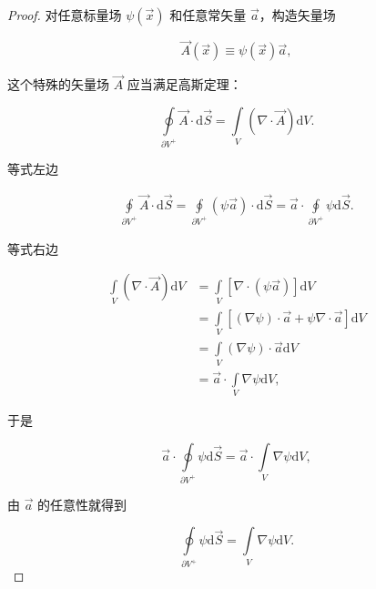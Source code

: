 \begin{proof}

对任意标量场 $\psi(\vec{x}) $ 和任意常矢量 $\vec{a} $，构造矢量场

\begin{equation}
\vec{A}(\vec{x})
\equiv \psi (\vec{x}) \vec{a},
\end{equation}

这个特殊的矢量场 $\vec{A} $ 应当满足高斯定理：

\begin{equation}
\oint\limits_{\partial V^+} \vec{A}\cdot\mathrm{d}\vec{S}
=\int\limits_{V} (\nabla\cdot\vec{A})\mathrm{d}V.
\end{equation}

等式左边

\begin{equation}
\begin{split}
\oint\limits_{\partial V^+} \vec{A}\cdot\mathrm{d}\vec{S}
=\oint\limits_{\partial V^+} \left(\psi \vec{a} \right) \cdot \mathrm{d}\vec{S}
=\vec{a} \cdot \oint\limits_{\partial V^+} \psi \mathrm{d}\vec{S}.
\end{split}
\end{equation}

等式右边

\begin{equation}
\begin{split}
\int\limits_{V} \left(\nabla\cdot\vec{A}\right)\mathrm{d}V
&=\int\limits_{V} \left[\nabla\cdot\left(\psi \vec{a} \right)\right]\mathrm{d}V \\
&=\int\limits_{V} \left[ \left(\nabla \psi \right) \cdot \vec{a} + \psi \nabla \cdot \vec{a} \right] \mathrm{d}V \\
&=\int\limits_{V} \left(\nabla \psi \right) \cdot \vec{a} \mathrm{d}V \\
&=\vec{a} \cdot \int\limits_{V} \nabla \psi \mathrm{d}V,
\end{split}
\end{equation}

于是

\begin{equation}
\vec{a} \cdot \oint\limits_{\partial V^+} \psi \mathrm{d}\vec{S}
=\vec{a} \cdot \int\limits_{V} \nabla \psi \mathrm{d}V,
\end{equation}

由 $\vec{a} $ 的任意性就得到

\begin{equation}
\oint\limits_{\partial V^+} \psi \mathrm{d}\vec{S} = \int\limits_{V} \nabla \psi \mathrm{d}V.
\end{equation}

\end{proof}

